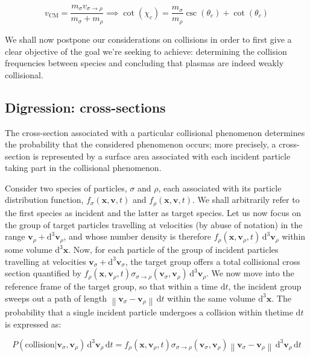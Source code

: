 \begin{equation}
    v_\text{CM}=\frac{m_\sigma v_{\sigma\to\rho}}{m_\sigma+m_\rho}\implies\cot(\chi_c)=\frac{m_\sigma}{m_\rho}\csc(\theta_c)+\cot(\theta_c)
\end{equation}

We shall now postpone our considerations on collisions in order to first give a clear objective of the goal we're seeking to achieve: determining the collision frequencies between species and concluding that plasmas are indeed weakly collisional. 

\subsection{Digression: cross-sections}

The cross-section associated with a particular collisional phenomenon determines the probability that the considered phenomenon occurs; more precisely, a cross-section is represented by a surface area associated with each incident particle taking part in the collisional phenomenon.

\vspace*{2.5pt}

\quad Consider two species of particles, $\sigma$ and $\rho$, each associated with its particle distribution function, $f_\sigma(\mathbf{x},\mathbf{v},t)$ and $f_\rho(\mathbf{x},\mathbf{v},t)$. We shall arbitrarily refer to the first species as incident and the latter as target species. Let us now focus on the group of target particles travelling at velocities (by abuse of notation) in the range $\mathbf{v}_\rho+\mathrm{d^3}\mathbf{v}_\rho$, and whose number density is therefore $f_\rho(\mathbf{x},\mathbf{v}_\rho,t)\,\mathrm{d^3}\mathbf{v}_\rho$ within some volume $\mathrm{d^3}\mathbf{x}$. Now, for each particle of the group of incident particles travelling at velocities $\mathbf{v}_\sigma + \mathrm{d^3}\mathbf{v}_\sigma$, the target group offers a total collisional cross section quantified by $f_\rho(\mathbf{x},\mathbf{v}_\rho,t)\sigma_{\sigma\to\rho}(\mathbf{v}_\sigma,\mathbf{v}_\rho)\,\mathrm{d^3}\mathbf{v}_\rho$. We now move into the reference frame of the target group, so that within a time $\mathrm{d}t$, the incident group sweeps out a path of length $\left\|\mathbf{v}_\sigma -\mathbf{v}_\rho\right\|\,\mathrm{d}t$ within the same volume $\mathrm{d^3}\mathbf{x}$. The probability that a single incident particle undergoes a collision within thetime $\mathrm{d}t$ is expressed as:

\begin{equation}
    \label{eq-preliminaries-13}
    P(\text{collision}|\mathbf{v}_\sigma,\mathbf{v}_\rho)\,\mathrm{d^3}\mathbf{v}_\rho\,\mathrm{d}t=f_\rho(\mathbf{x},\mathbf{v}_\rho,t)\sigma_{\sigma\to\rho}(\mathbf{v}_\sigma,\mathbf{v}_\rho)\left\|\mathbf{v}_\sigma-\mathbf{v}_\rho\right\|\,\mathrm{d^3}\mathbf{v}_\rho\,\mathrm{d}t
\end{equation}

